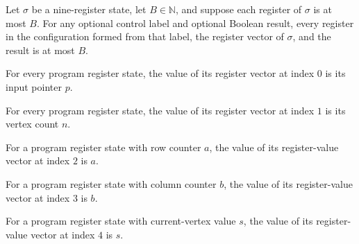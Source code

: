 \begin{lemma}
\label{Complexity.LogProg.PReg.reg}
\leanok
{}
Let $\sigma$ be a nine-register state, let $B\in\mathbb{N}$, and suppose each register
of $\sigma$ is at most $B$. For any optional control label and optional Boolean result,
every register in the configuration formed from that label, the register vector of
$\sigma$, and the result is at most $B$.
\end{lemma}

\begin{lemma}
\label{Complexity.LogProg.PReg.v_0}
\leanok
{}
For every program register state, the value of its register vector at index $0$ is its
input pointer $p$.
\end{lemma}

\begin{lemma}
\label{Complexity.LogProg.PReg.v_1}
\leanok
{}
For every program register state, the value of its register vector at index $1$ is its
vertex count $n$.
\end{lemma}

\begin{lemma}
\label{Complexity.LogProg.PReg.v_2}
\leanok
{}
For a program register state with row counter $a$, the value of its register-value
vector at index $2$ is $a$.
\end{lemma}

\begin{lemma}
\label{Complexity.LogProg.PReg.v_3}
\leanok
{}
For a program register state with column counter $b$, the value of its register-value
vector at index $3$ is $b$.
\end{lemma}

\begin{lemma}
\label{Complexity.LogProg.PReg.v_4}
\leanok
{}
For a program register state with current-vertex value $s$, the value of its
register-value vector at index $4$ is $s$.
\end{lemma}

